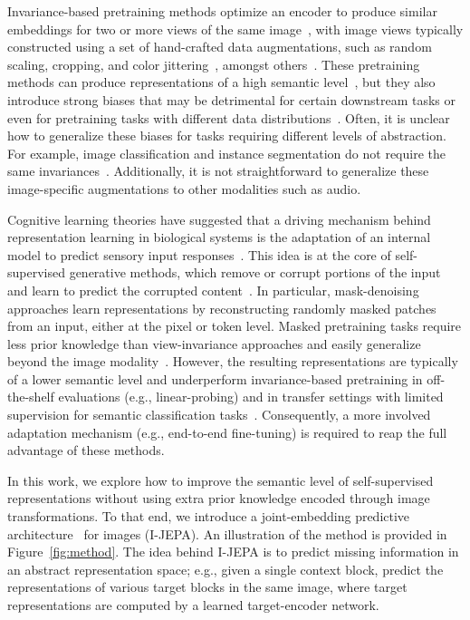 \documentclass[10pt,twocolumn,letterpaper]{article}
\newcommand{\putalg}{{I-JEPA}\xspace}
\begin{document}
Invariance-based pretraining methods optimize an encoder to produce similar embeddings for two or more views of the same image~\cite{bromley1993signature,chen2020simple}, with image views typically constructed using a set of hand-crafted data augmentations, such as random scaling, cropping, and color jittering~\cite{chen2020simple}, amongst others~\cite{grill2020bootstrap}.
These pretraining methods can produce representations of a high semantic level~\cite{caron2021emerging, assran2022masked}, but they also introduce strong biases that may be detrimental for certain downstream tasks or even for pretraining tasks with different data distributions~\cite{assran2022hidden}.
Often, it is unclear how to generalize these biases for tasks requiring different levels of abstraction.
For example, image classification and instance segmentation do not require the same invariances~\cite{bardes2022vicregl}.
Additionally, it is not straightforward to generalize these image-specific augmentations to other modalities such as audio.

Cognitive learning theories have suggested that a driving mechanism behind representation learning in biological systems is
the adaptation of an internal model
to predict sensory input responses~\cite{rao1999predictive,friston2005theory}.
This idea is at the core of self-supervised generative methods, which remove or corrupt portions of the input and learn to predict the corrupted content~\cite{vincent2010stacked,pathak2016context,he2021masked,bao2021beit,xie2021simmim,wei2021masked}.
In particular, mask-denoising approaches learn representations by reconstructing randomly masked patches from an input, either at the pixel or token level.
Masked pretraining tasks require less prior knowledge than view-invariance  approaches and easily generalize beyond the image modality~\cite{baevski2022data2vec}.
However, the resulting representations are typically of a lower semantic level and underperform invariance-based pretraining in off-the-shelf evaluations (e.g., linear-probing) and in transfer settings with limited supervision for semantic classification tasks~\cite{assran2022masked}.
Consequently, a more involved adaptation mechanism (e.g., end-to-end fine-tuning) is required to reap the full advantage of these methods.

In this work, we explore how to improve the semantic level of self-supervised representations without using extra prior knowledge encoded through image transformations. 
To that end, we introduce a joint-embedding predictive architecture~\cite{lecun2022path} for images (\putalg).
An illustration of the method is provided in Figure~\ref{fig:method}.
The idea behind \putalg is to predict missing information in an abstract representation space; e.g., given a single context block, predict the representations of various target blocks in the same image, where target representations are computed by a learned target-encoder network.
\end{document}
